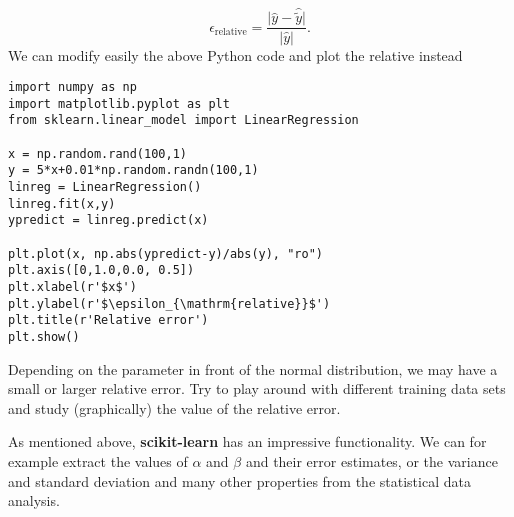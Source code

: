 \documentclass[%
oneside,                 %
final,                   %
10pt]{article}
\begin{document}
\[
\epsilon_{\mathrm{relative}}= \frac{\vert \hat{y} -\hat{\tilde{y}}\vert}{\vert \hat{y}\vert}.
\]
We can modify easily the above Python code and plot the relative instead
\begin{verbatim}
import numpy as np
import matplotlib.pyplot as plt
from sklearn.linear_model import LinearRegression

x = np.random.rand(100,1)
y = 5*x+0.01*np.random.randn(100,1)
linreg = LinearRegression()
linreg.fit(x,y)
ypredict = linreg.predict(x)

plt.plot(x, np.abs(ypredict-y)/abs(y), "ro")
plt.axis([0,1.0,0.0, 0.5])
plt.xlabel(r'$x$')
plt.ylabel(r'$\epsilon_{\mathrm{relative}}$')
plt.title(r'Relative error')
plt.show()
\end{verbatim}

Depending on the parameter in front of the normal distribution, we may
have a small or larger relative error. Try to play around with
different training data sets and study (graphically) the value of the
relative error.

As mentioned above, \textbf{scikit-learn} has an impressive functionality.
We can for example extract the values of $\alpha$ and $\beta$ and
their error estimates, or the variance and standard deviation and many
other properties from the statistical data analysis. 
\end{document}
